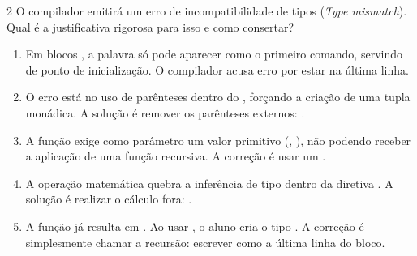 \documentclass[a4paper,10pt,brazil]{article}
\begin{document}
\begin{multicols}{2}
O compilador emitirá um erro de incompatibilidade de tipos (\emph{Type mismatch}). Qual é a justificativa rigorosa para isso e como consertar?

\begin{enumerate}
  \item Em blocos , a palavra  só pode aparecer como o primeiro comando, servindo de ponto de inicialização. O compilador acusa erro por estar na última linha.

  \item O erro está no uso de parênteses dentro do , forçando a criação de uma tupla monádica. A solução é remover os parênteses externos: .

  \item A função  exige como parâmetro um valor primitivo (, ), não podendo receber a aplicação de uma função recursiva. A correção é usar um .

  \item A operação matemática  quebra a inferência de tipo dentro da diretiva . A solução é realizar o cálculo fora: .
  \item A função  já resulta em . Ao usar , o aluno cria o tipo . A correção é simplesmente chamar a recursão: escrever  como a última linha do bloco.


\end{enumerate}


\end{multicols}
\end{document}
